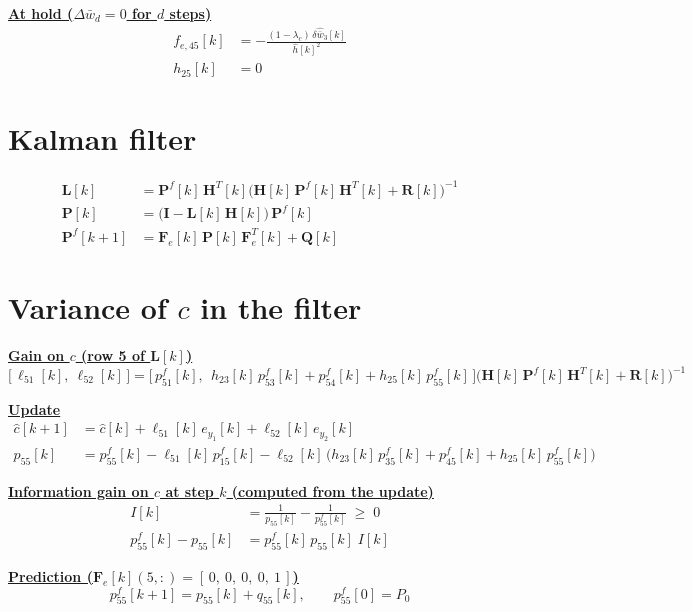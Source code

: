 \documentclass[11pt,a4paper]{ctexart}
\newcommand{\lc}{\lambda_c}
\newcommand{\bw}{\bar{w}}
\newcommand{\wh}{\hat{\bw}}
\newcommand{\hh}{\hat{h}}
\newcommand{\ch}{\hat{c}}
\newcommand{\Pf}{p^{f}_{55}}
\newcommand{\Pu}{p_{55}}
\newcommand{\hd}[1]{\par\bigskip\noindent\underline{\textbf{#1}}}
\begin{document}
\hd{At hold ($\Delta\bw_d = 0$ for $d$ steps)}
\[
\begin{aligned}
f_{e,45}[k] &= -\frac{(1-\lc)\,\delta\wh_3[k]}{\hh[k]^{2}} \\
h_{25}[k] &= 0
\end{aligned}
\]

\section{Kalman filter}

\[
\begin{aligned}
\mathbf{L}[k] &= \mathbf{P}^{f}[k]\,\mathbf{H}^{T}[k]\big(\mathbf{H}[k]\,\mathbf{P}^{f}[k]\,\mathbf{H}^{T}[k] + \mathbf{R}[k]\big)^{-1} \\
\mathbf{P}[k] &= \big(\mathbf{I} - \mathbf{L}[k]\,\mathbf{H}[k]\big)\,\mathbf{P}^{f}[k] \\
\mathbf{P}^{f}[k+1] &= \mathbf{F}_e[k]\,\mathbf{P}[k]\,\mathbf{F}_e^{T}[k] + \mathbf{Q}[k]
\end{aligned}
\]

\section{Variance of $c$ in the filter}

\hd{Gain on $c$ (row 5 of $\mathbf{L}[k]$)}
\[
\big[\,\ell_{51}[k],\ \ell_{52}[k]\,\big]
= \Big[\,p^{f}_{51}[k],\ \ h_{23}[k]\,p^{f}_{53}[k] + p^{f}_{54}[k] + h_{25}[k]\,\Pf[k]\,\Big]
\big(\mathbf{H}[k]\,\mathbf{P}^{f}[k]\,\mathbf{H}^{T}[k] + \mathbf{R}[k]\big)^{-1}
\]

\hd{Update}
\[
\begin{aligned}
\ch[k+1] &= \ch[k] + \ell_{51}[k]\,e_{y_1}[k] + \ell_{52}[k]\,e_{y_2}[k] \\
\Pu[k] &= \Pf[k] - \ell_{51}[k]\,p^{f}_{15}[k] - \ell_{52}[k]\,\Big(h_{23}[k]\,p^{f}_{35}[k] + p^{f}_{45}[k] + h_{25}[k]\,\Pf[k]\Big)
\end{aligned}
\]

\hd{Information gain on $c$ at step $k$ (computed from the update)}
\[
\begin{aligned}
I[k] &= \frac{1}{\Pu[k]} - \frac{1}{\Pf[k]} \;\ge\; 0 \\
\Pf[k] - \Pu[k] &= \Pf[k]\,\Pu[k]\; I[k]
\end{aligned}
\]

\hd{Prediction ($\mathbf{F}_e[k](5,:) = [\,0,\ 0,\ 0,\ 0,\ 1\,]$)}
\[
\Pf[k+1] = \Pu[k] + q_{55}[k], \qquad \Pf[0] = P_0
\]
\end{document}
